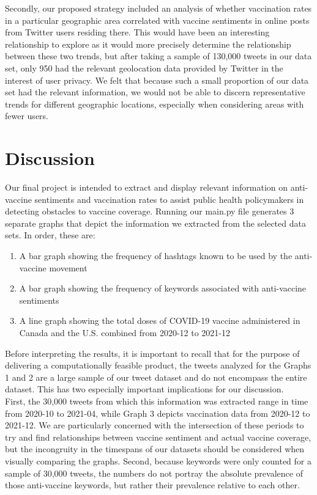 \documentclass[fontsize=11pt]{article}
\begin{document}
Secondly, our proposed strategy included an analysis of whether vaccination rates in a particular geographic area correlated with vaccine sentiments in online posts from Twitter users residing there. This would have been an interesting relationship to explore as it would more precisely determine the relationship between these two trends, but after taking a sample of 130,000 tweets in our data set, only 950 had the relevant geolocation data provided by Twitter in the interest of user privacy. We felt that because such a small proportion of our data set had the relevant information, we would not be able to discern representative trends for different geographic locations, especially when considering areas with fewer users.

\section*{Discussion}
Our final project is intended to extract and display relevant information on anti-vaccine sentiments and vaccination rates to assist public health policymakers in detecting obstacles to vaccine coverage. Running our main.py file generates 3 separate graphs that depict the information we extracted from the selected data sets. In order, these are:\\

\begin{enumerate}
    \item A bar graph showing the frequency of hashtags known to be used by the anti-vaccine movement
    \item A bar graph showing the frequency of keywords associated with anti-vaccine sentiments
    \item A line graph showing the total doses of COVID-19 vaccine administered in Canada and the U.S. combined from 2020-12 to 2021-12
\end{enumerate}


Before interpreting the results, it is important to recall that for the purpose of delivering a computationally feasible product, the tweets analyzed for the Graphs 1 and 2 are a large sample of our tweet dataset and do not encompass the entire dataset. This has two especially important implications for our discussion. \\

First, the 30,000 tweets from which this information was extracted range in time from 2020-10 to 2021-04, while Graph 3 depicts vaccination data from 2020-12 to 2021-12. We are particularly concerned with the intersection of these periods to try and find relationships between vaccine sentiment and actual vaccine coverage, but the incongruity in the timespans of our datasets should be considered when visually comparing the graphs. Second, because keywords were only counted for a sample of 30,000 tweets, the numbers do not portray the absolute prevalence of those anti-vaccine keywords, but rather their prevalence relative to each other. \\
\end{document}
